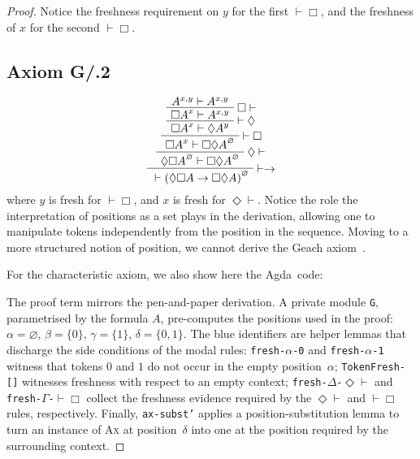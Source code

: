 \documentclass{article}
\newcommand{\seq}[2]{{#1} \vdash{} {#2}}
\newcommand{\pf}[2]{{#1}^{#2}} %
\newcommand{\agda}{\textsf{Agda}}
\theoremstyle{definition}
\begin{document}
\begin{proof}

Notice the freshness requirement on $y$ for the first $\vdash \Box$, and the freshness of $x$ for the second $\vdash \Box$.



\subsection*{Axiom G/.2}

\[
\AxiomC{$\seq{\pf{A}{x,y}}{\pf{A}{x,y}}$}
\RightLabel{$\Box \vdash$}
\UnaryInfC{$\seq{\pf{\Box A}{x}}{\pf{A}{x,y}}$}
\RightLabel{$\vdash \Diamond$}
\UnaryInfC{$\seq{\pf{\Box A}{x}}{\pf{\Diamond A}{y}}$}
\RightLabel{$\vdash \Box$}
\UnaryInfC{$\seq{\pf{\Box A}{x}}{\pf{\Box \Diamond A}{\varnothing}}$}
\RightLabel{$\Diamond \vdash$}
\UnaryInfC{$\seq{\pf{\Diamond \Box A}{\varnothing}}{\pf{\Box \Diamond A}{\varnothing}}$}
\RightLabel{$\vdash \rightarrow$}
\UnaryInfC{$\seq{}{\pf{(\Diamond \Box A \rightarrow \Box \Diamond A)}{\varnothing}}$}
\DisplayProof
\]
  where $y$ is fresh for $\vdash \Box$, and $x$ is fresh for $\Diamond \vdash$. Notice the role the interpretation of positions as a set plays in the derivation, allowing one to manipulate tokens independently from the position in the sequence. Moving to a more structured notion of position, we cannot derive the Geach axiom~\cite{Martini2023:CutElimination}. 

For the characteristic axiom, we also show here the \agda{}~code:

\noindent
The proof term mirrors the pen-and-paper derivation.
A private module \texttt{G}, parametrised by the formula $A$, pre-computes the positions used in the proof: $\alpha = \varnothing$, $\beta = \{0\}$, $\gamma = \{1\}$, $\delta = \{0,1\}$.
The blue identifiers are helper lemmas that discharge the side conditions of the modal rules:
\texttt{fresh-$\alpha$-0} and \texttt{fresh-$\alpha$-1} witness that tokens $0$ and $1$ do not occur in the empty position~$\alpha$;
\texttt{TokenFresh-[]} witnesses freshness with respect to an empty context;
\texttt{fresh-$\Delta$-$\Diamond\vdash$} and \texttt{fresh-$\Gamma$-$\vdash\Box$} collect the freshness evidence required by the $\Diamond\vdash$ and $\vdash\Box$ rules, respectively.
Finally, \texttt{ax-subst'} applies a position-substitution lemma to turn an instance of \textsc{Ax} at position~$\delta$ into one at the position required by the surrounding context.
\bigskip


\end{proof}
\end{document}
